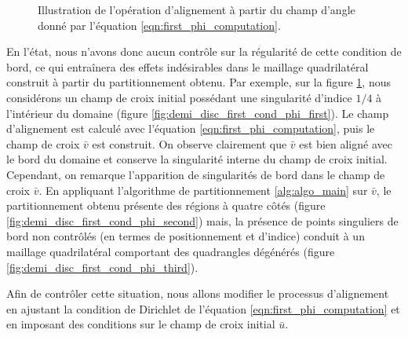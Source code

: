 \begin{figure}[!h]
\caption{Illustration de l'opération d'alignement à partir du champ d'angle donné par l'équation \eqref{eqn:first_phi_computation}.}
\label{fig:demi_disc_first_cond_phi}
\end{figure}

En l'état, nous n'avons donc aucun contrôle sur la régularité de cette condition de bord, ce qui entraînera des effets indésirables dans le maillage quadrilatéral construit à partir du partitionnement obtenu. Par exemple, sur la figure \ref{fig:demi_disc_first_cond_phi}, nous considérons un champ de croix initial possédant une singularité d'indice $1/4$ à l'intérieur du domaine (figure \ref{fig:demi_disc_first_cond_phi_first}). Le champ d'alignement est calculé avec l'équation \eqref{eqn:first_phi_computation}, puis le champ de croix $\bar{v}$ est construit. On observe clairement que $\bar{v}$ est bien aligné avec le bord du domaine et conserve la singularité interne du champ de croix initial. Cependant, on remarque l'apparition de singularités de bord dans le champ de croix $\bar{v}$. En appliquant l'algorithme de partitionnement \ref{alg:algo_main} sur $\bar{v}$, le partitionnement obtenu présente des régions à quatre côtés (figure \ref{fig:demi_disc_first_cond_phi_second}) mais, la présence de points singuliers de bord non contrôlés (en termes de positionnement et d'indice) conduit à un maillage quadrilatéral comportant des quadrangles dégénérés (figure \ref{fig:demi_disc_first_cond_phi_third}).


Afin de contrôler cette situation, nous allons modifier le processus d'alignement en ajustant la condition de Dirichlet de l'équation \eqref{eqn:first_phi_computation} et en imposant des conditions sur le champ de croix initial $\bar{u}$.

